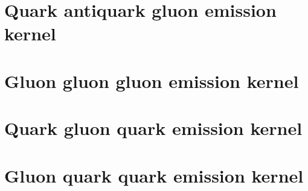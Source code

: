 \documentclass[12pt,a4paper,oneside]{report}
\begin{document}
    \parindent=0pt
    \linespread{1.2}
    \thispagestyle{plain}



\pagebreak

\tableofcontents
\thispagestyle{empty}
\thispagestyle{empty}
\quad
\newpage
{} 





\newpage



\chapter{Quark antiquark gluon emission kernel}

\newpage
\chapter{Gluon gluon gluon emission kernel}

\chapter{Quark gluon quark emission kernel}
  
\chapter{Gluon quark quark emission kernel}
       





\appendix

 
\end{document}
